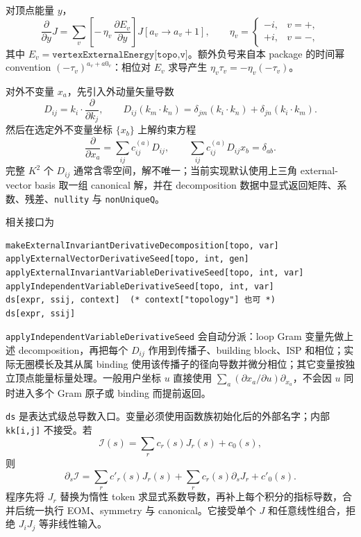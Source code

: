 ﻿\documentclass[a4paper,11pt]{article}
\begin{document}
对顶点能量 $y$，
\begin{equation}
 \frac{\partial}{\partial y}J
 =\sum_v
 \left[-\,\eta_v\,\frac{\partial E_v}{\partial y}\right]
 J[a_v\to a_v+1],
 \qquad
 \eta_v=
 \begin{cases}
 -i,&v=+,\\
 +i,&v=-,
 \end{cases}
\end{equation}
其中 $E_v=\texttt{vertexExternalEnergy[topo,v]}$。额外负号来自本 package 的时间幂 convention
$(-\tau_v)^{a_v+a0_v}$：相位对 $E_v$ 求导产生 $\eta_v\tau_v=-\eta_v(-\tau_v)$。

对外不变量 $x_a$，先引入外动量矢量导数
\begin{equation}
 D_{ij}=k_i\cdot\frac{\partial}{\partial k_j},
 \qquad
 D_{ij}(k_m\cdot k_n)
 =\delta_{jm}(k_i\cdot k_n)+\delta_{jn}(k_i\cdot k_m).
\end{equation}
然后在选定外不变量坐标 $\{x_b\}$ 上解约束方程
\begin{equation}
 \frac{\partial}{\partial x_a}
 =\sum_{ij}c^{(a)}_{ij}D_{ij},
 \qquad
 \sum_{ij}c^{(a)}_{ij}D_{ij}x_b=\delta_{ab}.
\end{equation}
完整 $K^2$ 个 $D_{ij}$ 通常含零空间，解不唯一；当前实现默认使用上三角 external-vector basis 取一组 canonical 解，并在 decomposition 数据中显式返回矩阵、系数、残差、\texttt{nullity} 与 \texttt{nonUniqueQ}。

相关接口为
\begin{verbatim}
makeExternalInvariantDerivativeDecomposition[topo, var]
applyExternalVectorDerivativeSeed[topo, int, gen]
applyExternalInvariantVariableDerivativeSeed[topo, int, var]
applyIndependentVariableDerivativeSeed[topo, int, var]
ds[expr, ssij, context]  (* context["topology"] 也可 *)
ds[expr, ssij]
\end{verbatim}
\texttt{applyIndependentVariableDerivativeSeed} 会自动分派：loop Gram 变量先做上述 decomposition，再把每个 $D_{ij}$ 作用到传播子、building block、ISP 和相位；实际无圈模长及其从属 binding 使用该传播子的径向导数并微分相位；其它变量按独立顶点能量标量处理。一般用户坐标 $u$ 直接使用 $\sum_a(\partial x_a/\partial u)\partial_{x_a}$，不会因 $u$ 同时进入多个 Gram 原子或 binding 而提前返回。

\texttt{ds} 是表达式级总导数入口。变量必须使用函数族初始化后的外部名字；内部 \texttt{kk[i,j]} 不接受。若
\begin{equation}
 \mathcal I(s)=\sum_r c_r(s)J_r(s)+c_0(s),
\end{equation}
则
\begin{equation}
 \partial_s\mathcal I
 =\sum_r c'_r(s)J_r(s)+\sum_r c_r(s)\partial_sJ_r+c'_0(s).
\end{equation}
程序先将 $J_r$ 替换为惰性 token 求显式系数导数，再补上每个积分的指标导数，合并后统一执行 EOM、symmetry 与 canonical。它接受单个 $J$ 和任意线性组合，拒绝 $J_iJ_j$ 等非线性输入。
\end{document}
